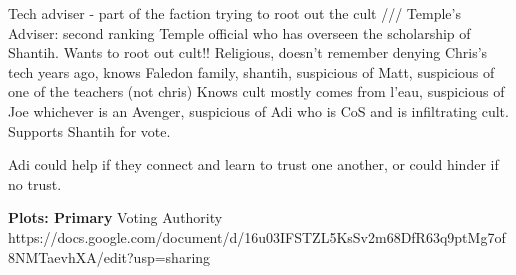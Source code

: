 \documentclass[char]{GL2020}
\begin{document}
\name{\cAntiChup{}}









Tech adviser - part of the faction trying to root out the cult /// 
Temple's Adviser: second ranking Temple official who has overseen the scholarship of Shantih.  Wants to root out cult!! 	Religious, doesn't remember denying Chris's tech years ago, knows Faledon family, shantih, suspicious of Matt, suspicious of one of the teachers (not chris) Knows cult mostly comes from l'eau, suspicious of Joe whichever is an Avenger, suspicious of Adi who is CoS and is infiltrating cult.  Supports Shantih for vote.

Adi could help if they connect and learn to trust one another, or could hinder if no trust.


\textbf{Plots: Primary}
Voting Authority
https://docs.google.com/document/d/16u03IFSTZL5KsSv2m68DfR63q9ptMg7of8NMTaevhXA/edit?usp=sharing
\end{document}
